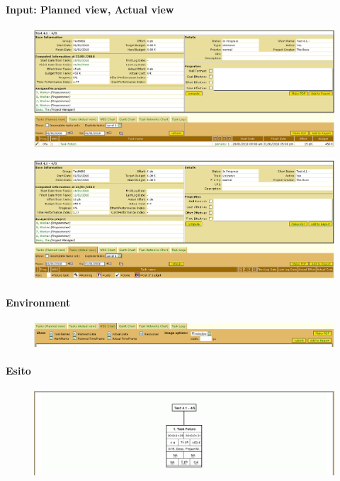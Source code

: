 \paragraph{Input: Planned view, Actual view}
\begin{figure}[h!]
\centering
\includegraphics[width=\textwidth]{tests/TEST_WBS/4.1/4.1_4_5/Esempio_2/input.png}
\end{figure}
\begin{figure}[h!]
\centering
\includegraphics[width=\textwidth]{tests/TEST_WBS/4.1/4.1_4_5/Esempio_2/input_actual.png}
\end{figure}
\newpage

\paragraph{Environment}
\begin{figure}[h!]
\centering
\includegraphics[width=\textwidth]{tests/TEST_WBS/4.1/4.1_4_5/Esempio_2/environment.png}
\end{figure}
\paragraph{Esito}
\begin{figure}[h!]
\centering
\includegraphics[width=\textwidth]{tests/TEST_WBS/4.1/4.1_4_5/Esempio_2/output.png}
\end{figure}
\newpage
